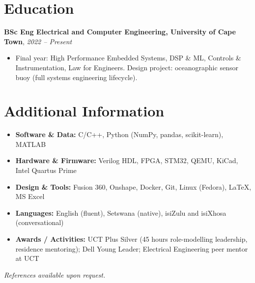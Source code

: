\documentclass[10pt,a4paper]{article}
\newcommand{\role}[3]{\textbf{#1}, \textbf{#2}\hfill\textit{#3}\par\vspace{-1pt}}
\begin{document}
\section*{Education}
\role{BSc Eng Electrical and Computer Engineering, University of Cape Town}{}{2022 -- Present}
\begin{itemize}
\item Final year: High Performance Embedded Systems, DSP \& ML, Controls \& Instrumentation, Law for Engineers. Design project: oceanographic sensor buoy (full systems engineering lifecycle).
\end{itemize}

\section*{Additional Information}
\begin{itemize}
\item \textbf{Software \& Data:} C/C++, Python (NumPy, pandas, scikit-learn), MATLAB
\item \textbf{Hardware \& Firmware:} Verilog HDL, FPGA, STM32, QEMU, KiCad, Intel Quartus Prime
\item \textbf{Design \& Tools:} Fusion 360, Onshape, Docker, Git, Linux (Fedora), \LaTeX, MS Excel
\item \textbf{Languages:} English (fluent), Setswana (native), isiZulu and isiXhosa (conversational)
\item \textbf{Awards / Activities:} UCT Plus Silver (45 hours role-modelling leadership, residence mentoring); Dell Young Leader; Electrical Engineering peer mentor at UCT
\end{itemize}
\vspace{2pt}\textit{References available upon request.}
\end{document}
